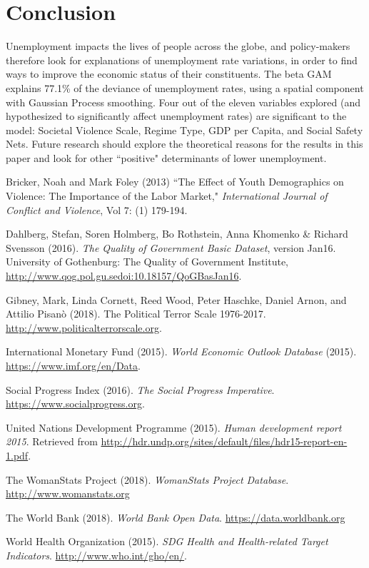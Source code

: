 \documentclass[letterpaper,11pt]{article}
\begin{document}
\section{Conclusion}

Unemployment impacts the lives of people across the globe, and policy-makers therefore look for explanations of unemployment rate variations, in order to find ways to improve the economic status of their constituents. The beta GAM explains 77.1\% of the deviance of unemployment rates, using a spatial component with Gaussian Process smoothing. Four out of the eleven variables explored (and hypothesized to significantly affect unemployment rates) are significant to the model: Societal Violence Scale, Regime Type, GDP per Capita, and Social Safety Nets. Future research should explore the theoretical reasons for the results in this paper and look for other ``positive" determinants of lower unemployment. 

\newpage

\begin{thebibliography}{99}

 Bricker, Noah and Mark Foley (2013) ``The Effect of Youth Demographics on Violence: The Importance of the Labor Market," \emph{International Journal of Conflict and Violence}, Vol 7: (1) 179-194.

 Dahlberg, Stefan, Soren Holmberg, Bo Rothstein, Anna Khomenko \& Richard Svensson (2016). \emph{The Quality of Government Basic Dataset}, version Jan16. University of Gothenburg: The Quality of Government Institute, \url{http://www.qog.pol.gu.sedoi:10.18157/QoGBasJan16}.

 Gibney, Mark, Linda Cornett, Reed Wood, Peter Haschke, Daniel Arnon, and Attilio Pisanò (2018). The Political Terror Scale 1976-2017. \url{http://www.politicalterrorscale.org}.

 International Monetary Fund (2015). \emph{World Economic Outlook Database} (2015). \url{https://www.imf.org/en/Data}.

 Social Progress Index (2016). \emph{The Social Progress Imperative}. \url{https://www.socialprogress.org}.

 United Nations Development Programme (2015). \emph{Human development report 2015}. Retrieved from \url{http://hdr.undp.org/sites/default/files/hdr15-report-en-1.pdf}.

 The WomanStats Project (2018). \emph{WomanStats Project Database}. \url{http://www.womanstats.org} 

 The World Bank (2018). \emph{World Bank Open Data}. \url{https://data.worldbank.org}

 World Health Organization (2015). \emph{SDG Health and Health-related Target Indicators}. \url{http://www.who.int/gho/en/}.

\end{thebibliography}
\end{document}
